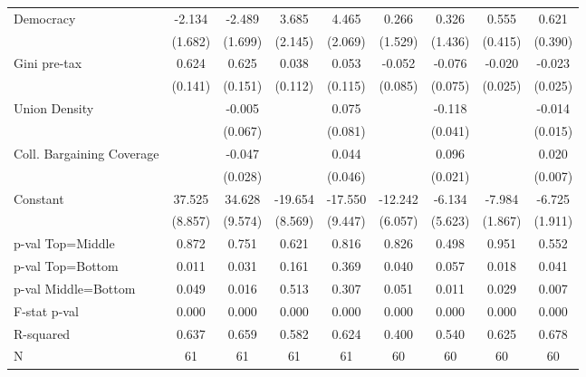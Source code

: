 \begin{tabular}{l*{8}{c}}
\addlinespace
Democracy           &      -2.134&      -2.489&       3.685&       4.465&       0.266&       0.326&       0.555&       0.621\\
                    &     (1.682)&     (1.699)&     (2.145)&     (2.069)&     (1.529)&     (1.436)&     (0.415)&     (0.390)\\
\addlinespace
Gini pre-tax        &       0.624&       0.625&       0.038&       0.053&      -0.052&      -0.076&      -0.020&      -0.023\\
                    &     (0.141)&     (0.151)&     (0.112)&     (0.115)&     (0.085)&     (0.075)&     (0.025)&     (0.025)\\
\addlinespace
Union Density       &            &      -0.005&            &       0.075&            &      -0.118&            &      -0.014\\
                    &            &     (0.067)&            &     (0.081)&            &     (0.041)&            &     (0.015)\\
\addlinespace
Coll. Bargaining Coverage&            &      -0.047&            &       0.044&            &       0.096&            &       0.020\\
                    &            &     (0.028)&            &     (0.046)&            &     (0.021)&            &     (0.007)\\
\addlinespace
Constant            &      37.525&      34.628&     -19.654&     -17.550&     -12.242&      -6.134&      -7.984&      -6.725\\
                    &     (8.857)&     (9.574)&     (8.569)&     (9.447)&     (6.057)&     (5.623)&     (1.867)&     (1.911)\\
\midrule
p-val Top=Middle    &       0.872&       0.751&       0.621&       0.816&       0.826&       0.498&       0.951&       0.552\\
p-val Top=Bottom    &       0.011&       0.031&       0.161&       0.369&       0.040&       0.057&       0.018&       0.041\\
p-val Middle=Bottom &       0.049&       0.016&       0.513&       0.307&       0.051&       0.011&       0.029&       0.007\\
F-stat p-val        &       0.000&       0.000&       0.000&       0.000&       0.000&       0.000&       0.000&       0.000\\
R-squared           &       0.637&       0.659&       0.582&       0.624&       0.400&       0.540&       0.625&       0.678\\
N                   &          61&          61&          61&          61&          60&          60&          60&          60\\
\bottomrule
\end{tabular}
